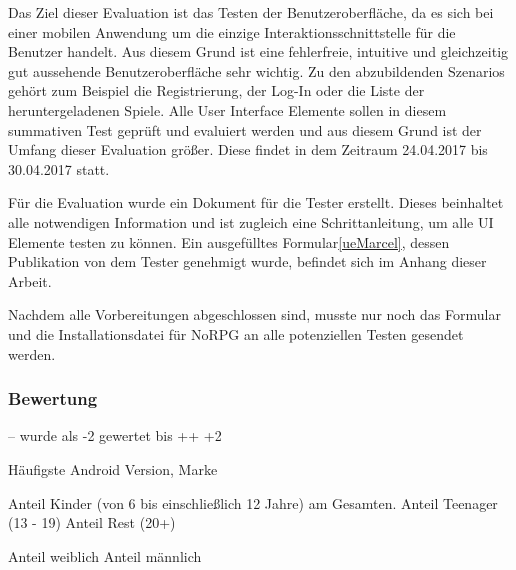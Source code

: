 			Das Ziel dieser Evaluation ist das Testen der Benutzeroberfläche, da es sich bei einer mobilen Anwendung um die einzige Interaktionsschnittstelle für die Benutzer handelt. Aus diesem Grund ist eine fehlerfreie, intuitive und gleichzeitig gut aussehende Benutzeroberfläche sehr wichtig. Zu den abzubildenden Szenarios gehört zum Beispiel die Registrierung, der Log-In oder die Liste der heruntergeladenen Spiele. Alle User Interface Elemente sollen in diesem summativen Test geprüft und evaluiert werden und aus diesem Grund ist der Umfang dieser Evaluation größer. Diese findet in dem Zeitraum 24.04.2017 bis 30.04.2017 statt.
		
			Für die Evaluation wurde ein Dokument für die Tester erstellt. Dieses beinhaltet alle notwendigen Information und ist zugleich eine Schrittanleitung, um alle UI Elemente testen zu können. Ein ausgefülltes Formular\ref{ueMarcel}, dessen Publikation von dem Tester genehmigt wurde, befindet sich im Anhang dieser Arbeit.
		
			Nachdem alle Vorbereitungen abgeschlossen sind, musste nur noch das Formular und die Installationsdatei für NoRPG an alle potenziellen Testen gesendet werden.
		
		\subsubsection{Bewertung}
			-- wurde als -2 gewertet bis ++ +2
			
			Häufigste Android Version, Marke
			
			Anteil Kinder (von 6 bis einschließlich 12 Jahre) am Gesamten.
			Anteil Teenager (13 - 19)
			Anteil Rest (20+)
			
			Anteil weiblich
			Anteil männlich
			
